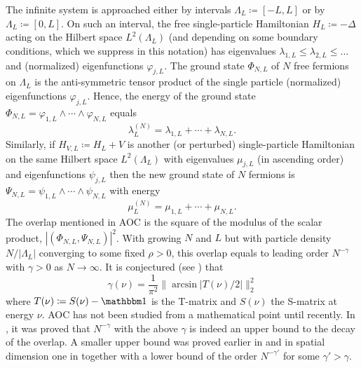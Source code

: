 The infinite system is approached either by intervals $\Lambda_L\coloneqq [-L,L]$ or by $\Lambda_L \coloneqq [0,L]$. 
On such an interval, the free single-particle Hamiltonian $H_L\coloneqq -\Delta$ acting on the Hilbert space $L^2(\Lambda_L)$ 
(and depending on some boundary conditions, which we suppress in this notation) has eigenvalues 
$\lambda_{1,L}\leq\lambda_{2,L}\leq \ldots$ and (normalized) eigenfunctions $\varphi_{j,L}$. 
The ground state $\Phi_{N,L}$ of $N$ free fermions on $\Lambda_L$ is 
the anti-symmetric tensor product of the single particle (normalized) eigenfunctions $\varphi_{j,L}$. 
Hence, the energy of the ground state $\Phi_{N,L} = \varphi_{1,L} \wedge\cdots\wedge\varphi_{N,L}$ equals
\begin{equation}\label{intro01}
  \lambda^{(N)}_L = \lambda_{1,L}+\cdots+\lambda_{N,L} .
\end{equation}
Similarly, if $H_{V,L} \coloneqq H_L+V$ is another (or perturbed) single-particle Hamiltonian on the same Hilbert space $L^2(\Lambda_L)$ 
with eigenvalues $\mu_{j,L}$ (in ascending order) and eigenfunctions $\psi_{j,L}$ then the new ground state of 
$N$ fermions is $\Psi_{N,L} =\psi_{1,L}\wedge\cdots\wedge\psi_{N,L}$ with energy
\begin{equation}\label{intro02}
  \mu^{(N)}_L = \mu_{1,L}+\cdots+\mu_{N,L}  .
\end{equation}
The overlap mentioned in AOC is the square of the modulus of the scalar product, $|(\Phi_{N,L},\Psi_{N,L})|^2$. 
With growing $N$ and $L$ but with particle density $N/|\Lambda_L|$ converging to some fixed $\rho>0$, this
overlap equals to leading order $N^{-\gamma}$ with $\gamma>0$ as $N\to\infty$. 
It is conjectured (see \cite{Anderson1967a,GebertKuettlerMuellerOtte2016}) that
\begin{equation*}
  \gamma(\nu) = \frac{1}{\pi^2}\|\arcsin|T(\nu)/2|\|_2^2
\end{equation*}
where $T(\nu)\coloneqq S(\nu)-\id$ is the T-matrix and $S(\nu)$ the S-matrix at energy $\nu$. 
AOC has not been studied from a mathematical point until recently. In \cite{GebertKuettlerMuellerOtte2016}, it was proved
that $N^{-\gamma}$ with the above $\gamma$ is indeed an upper bound to the decay of the overlap. A smaller upper bound was proved earlier
in \cite{GebertKuettlerMueller2014} and in spatial dimension one in \cite{KuettlerOtteSpitzer2014} together with a lower bound of the
order $N^{-\gamma'}$ for some $\gamma'>\gamma$.

